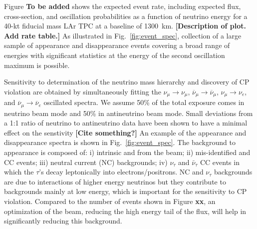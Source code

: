 %

Figure {\bf To be added}
shows the expected event rate, including
expected flux, cross-section, and oscillation probabilities as a function 
of neutrino energy for a 40-kt fiducial mass LAr TPC at a baseline of 1300~km. 
{\bf [Description of plot.  Add rate table.]}
As illustrated in Fig.~\ref{fig:event_spec}, collection of
a large sample of \nue appearance and \numu disappearance 
events covering a broad range of energies with significant statistics at the energy
of the second oscillation maximum is possible.

%

Sensitivity to determination of the neutrino mass hierarchy and discovery
of CP violation are obtained by
simultaneously fitting the $\nu_\mu \rightarrow \nu_\mu$,
$\overline{\nu}_\mu \rightarrow \overline{\nu}_\mu$, $\nu_\mu \rightarrow \nu_e$, 
and  $\overline{\nu}_\mu \rightarrow \overline{\nu}_e$ oscillated spectra.  We assume 50\% of the total exposure comes in neutrino beam mode and 50\% in antineutrino beam mode.  Small deviations from a 1:1 ratio of neutrino to antineutrino data have been shown to have a minimal effect on the senstivity {\bf [Cite something?]}
An example of the \nue appearance and \numu disappearance spectra is shown in 
Fig.~\ref{fig:event_spec}.
The background to \nue appearance is composed of: i) intrinsic \nue and \anue 
from the beam; ii) mis-identified \numu and \anumu CC events; 
iii) neutral current (NC) backgrounds; iv) $\nu_\tau$ and $\bar{\nu}_\tau$ CC events 
in which the $\tau$'s decay leptonically into electrons/positrons. NC and $\nu_\tau$ 
backgrounds are due to interactions of higher energy neutrinos but they contribute to 
backgrounds mainly at low energy, which is important for the sensitivity to CP violation. 
Compared to the number of events shown in Figure {\bf xx}, an optimization of the beam, 
reducing the high energy tail of the flux, will help in significantly reducing this 
background. 

